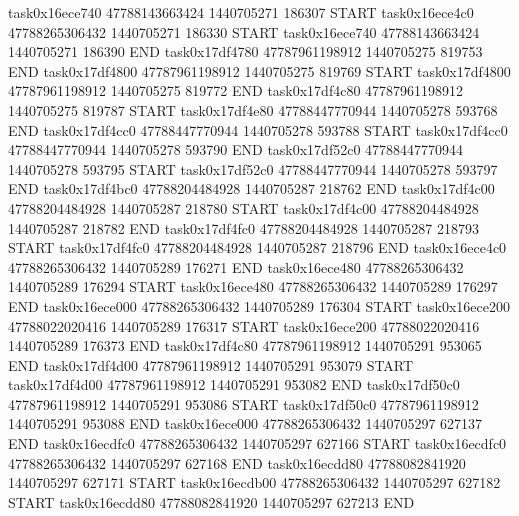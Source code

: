 task0x16ece740 47788143663424          1440705271               186307  START
task0x16ece4c0 47788265306432          1440705271               186330  START
task0x16ece740 47788143663424          1440705271               186390  END
task0x17df4780 47787961198912          1440705275               819753  END
task0x17df4800 47787961198912          1440705275               819769  START
task0x17df4800 47787961198912          1440705275               819772  END
task0x17df4c80 47787961198912          1440705275               819787  START
task0x17df4e80 47788447770944          1440705278               593768  END
task0x17df4cc0 47788447770944          1440705278               593788  START
task0x17df4cc0 47788447770944          1440705278               593790  END
task0x17df52c0 47788447770944          1440705278               593795  START
task0x17df52c0 47788447770944          1440705278               593797  END
task0x17df4bc0 47788204484928          1440705287               218762  END
task0x17df4c00 47788204484928          1440705287               218780  START
task0x17df4c00 47788204484928          1440705287               218782  END
task0x17df4fc0 47788204484928          1440705287               218793  START
task0x17df4fc0 47788204484928          1440705287               218796  END
task0x16ece4c0 47788265306432          1440705289               176271  END
task0x16ece480 47788265306432          1440705289               176294  START
task0x16ece480 47788265306432          1440705289               176297  END
task0x16ece000 47788265306432          1440705289               176304  START
task0x16ece200 47788022020416          1440705289               176317  START
task0x16ece200 47788022020416          1440705289               176373  END
task0x17df4c80 47787961198912          1440705291               953065  END
task0x17df4d00 47787961198912          1440705291               953079  START
task0x17df4d00 47787961198912          1440705291               953082  END
task0x17df50c0 47787961198912          1440705291               953086  START
task0x17df50c0 47787961198912          1440705291               953088  END
task0x16ece000 47788265306432          1440705297               627137  END
task0x16ecdfc0 47788265306432          1440705297               627166  START
task0x16ecdfc0 47788265306432          1440705297               627168  END
task0x16ecdd80 47788082841920          1440705297               627171  START
task0x16ecdb00 47788265306432          1440705297               627182  START
task0x16ecdd80 47788082841920          1440705297               627213  END
